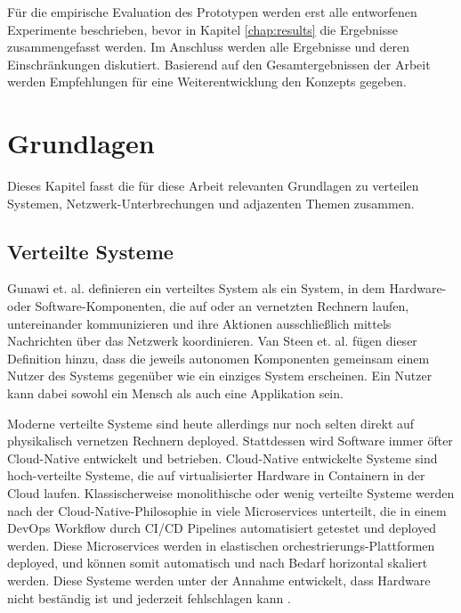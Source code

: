 \documentclass[12pt,a4paper]{report}
\begin{document}
Für die empirische Evaluation des Prototypen werden erst alle entworfenen Experimente beschrieben, bevor in Kapitel
\ref{chap:results} die Ergebnisse zusammengefasst werden. Im Anschluss werden alle Ergebnisse und deren Einschränkungen
diskutiert. Basierend auf den Gesamtergebnissen der Arbeit werden Empfehlungen für eine Weiterentwicklung den Konzepts
gegeben.



\chapter{Grundlagen}
Dieses Kapitel fasst die für diese Arbeit relevanten Grundlagen zu verteilen Systemen, Netzwerk-Unterbrechungen und adjazenten
Themen zusammen.

\section{Verteilte Systeme}
Gunawi et. al. \cite{distributed_systems_concepts_and_design} definieren ein verteiltes System als ein System, in dem Hardware-
oder Software-Komponenten, die auf oder an vernetzten Rechnern laufen, untereinander kommunizieren und ihre Aktionen
ausschließlich mittels Nachrichten über das Netzwerk koordinieren. Van Steen et. al.
\cite{brief_introduction_to_distributed_systems} fügen dieser Definition hinzu, dass die jeweils autonomen Komponenten gemeinsam
einem Nutzer des Systems gegenüber wie ein einziges System erscheinen. Ein Nutzer kann dabei sowohl ein Mensch als auch eine
Applikation sein.

Moderne verteilte Systeme sind heute allerdings nur noch selten direkt auf physikalisch vernetzen Rechnern deployed. Stattdessen
wird Software immer öfter Cloud-Native entwickelt und betrieben. Cloud-Native entwickelte Systeme sind hoch-verteilte Systeme, die
auf virtualisierter Hardware in Containern in der Cloud laufen. Klassischerweise monolithische oder wenig verteilte Systeme
werden nach der Cloud-Native-Philosophie in viele Microservices unterteilt, die in einem DevOps Workflow durch CI/CD Pipelines
automatisiert getestet und deployed werden. Diese Microservices werden in elastischen orchestrierungs-Plattformen deployed, und
können somit automatisch und nach Bedarf horizontal skaliert werden. \cite{cloud_native_10_years} Diese Systeme werden unter der
Annahme entwickelt, dass Hardware nicht beständig ist und jederzeit fehlschlagen kann \cite{cloud_native_applications}.
\end{document}
